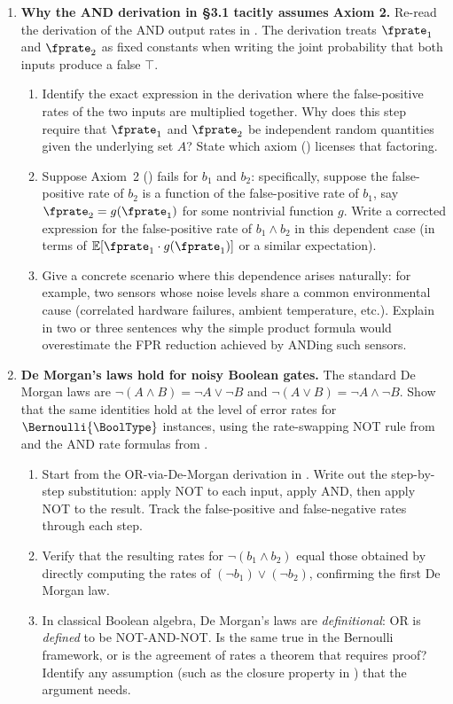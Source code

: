 \begin{enumerate}
\item \exstarstarstar
\textbf{Why the AND derivation in §3.1 tacitly assumes Axiom 2.}
Re-read the derivation of the AND output rates in .
The derivation treats $\fprate_1$ and $\fprate_2$ as fixed constants when
writing the joint probability that both inputs produce a false $\top$.
\begin{enumerate}
  \item[(a)] Identify the exact expression in the derivation where the false-positive
    rates of the two inputs are multiplied together. Why does this step require
    that $\fprate_1$ and $\fprate_2$ be independent random quantities given the
    underlying set $A$?
    State which axiom () licenses that factoring.
  \item[(b)] Suppose Axiom~2 () fails for $b_1$ and $b_2$:
    specifically, suppose the false-positive rate of $b_2$ is a function of the
    false-positive rate of $b_1$, say $\fprate_2 = g(\fprate_1)$ for some
    nontrivial function $g$.
    Write a corrected expression for the false-positive rate of $b_1 \wedge b_2$
    in this dependent case (in terms of $\mathbb{E}[\fprate_1 \cdot g(\fprate_1)]$
    or a similar expectation).
  \item[(c)] Give a concrete scenario where this dependence arises naturally:
    for example, two sensors whose noise levels share a common environmental
    cause (correlated hardware failures, ambient temperature, etc.).
    Explain in two or three sentences why the simple product formula would
    overestimate the FPR reduction achieved by ANDing such sensors.
\end{enumerate}

\item \exstarstarstar
\textbf{De Morgan's laws hold for noisy Boolean gates.}
The standard De Morgan laws are $\neg(A \wedge B) = \neg A \vee \neg B$
and $\neg(A \vee B) = \neg A \wedge \neg B$.
Show that the same identities hold at the level of error rates for
$\Bernoulli{\BoolType}$ instances, using the rate-swapping NOT rule from
 and the AND rate formulas from .
\begin{enumerate}
  \item[(a)] Start from the OR-via-De-Morgan derivation in .
    Write out the step-by-step substitution: apply NOT to each input, apply
    AND, then apply NOT to the result. Track the false-positive and false-negative
    rates through each step.
  \item[(b)] Verify that the resulting rates for $\neg(b_1 \wedge b_2)$ equal
    those obtained by directly computing the rates of $(\neg b_1) \vee (\neg b_2)$,
    confirming the first De Morgan law.
  \item[(c)] In classical Boolean algebra, De Morgan's laws are
    \emph{definitional}: OR is \emph{defined} to be NOT-AND-NOT.
    Is the same true in the Bernoulli framework, or is the agreement of
    rates a theorem that requires proof?
    Identify any assumption (such as the closure property in
    ) that the argument needs.
\end{enumerate}


\end{enumerate}
